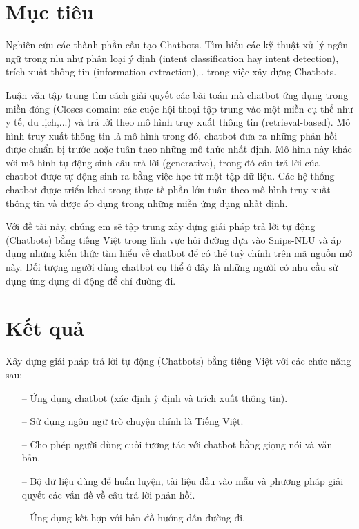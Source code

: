 \section{Mục tiêu}

Nghiên cứu các thành phần cấu tạo Chatbots. Tìm hiểu các kỹ thuật xử lý ngôn ngữ trong \ac{nlu} như phân loại ý định (intent classification hay intent detection), trích xuất thông tin (information extraction),.. trong việc xây dựng Chatbots.

Luận văn tập trung tìm cách giải quyết các bài toán mà chatbot ứng dụng trong miền đóng (Closes domain: các cuộc hội thoại tập trung vào một miền cụ thể như y tế, du lịch,...) và trả lời theo mô hình truy xuất thông tin (retrieval-based). Mô hình truy xuất thông tin là mô hình trong đó, chatbot đưa ra những phản hồi được chuẩn bị trước hoặc tuân theo những mô thức nhất định. Mô hình này khác với mô hình tự động sinh câu trả lời (generative), trong đó câu trả lời của chatbot được tự động sinh ra bằng việc học từ một tập dữ liệu. Các hệ thống chatbot được triển khai trong thực tế phần lớn tuân theo mô hình truy xuất thông tin và được áp dụng trong những miền ứng dụng nhất định.

Với đề tài này, chúng em sẽ tập trung xây dựng giải pháp trả lời tự động (Chatbots) bằng tiếng Việt trong lĩnh vực hỏi đường dựa vào Snips-NLU và áp dụng những kiến thức tìm hiểu về chatbot để có thể tuỳ chỉnh trên mã nguồn mở này. Đối tượng người dùng chatbot cụ thể ở đây là những người có nhu cầu sử dụng ứng dụng di động để chỉ đường đi.

\section{Kết quả}
Xây dựng giải pháp trả lời tự động (Chatbots) bằng tiếng Việt với các chức năng sau:
\begin{itemize}
    \item[--] Ứng dụng chatbot (xác định ý định và trích xuất thông tin).
    \item[--] Sử dụng ngôn ngữ trò chuyện chính là Tiếng Việt.
    \item[--] Cho phép người dùng cuối tương tác với chatbot bằng giọng nói và văn bản.
    \item[--] Bộ dữ liệu dùng để huấn luyện, tài liệu đầu vào mẫu và phương pháp giải quyết các vấn đề về câu trả lời phản hồi.
    \item[--] Ứng dụng kết hợp với bản đồ hướng dẫn đường đi.
\end{itemize}



